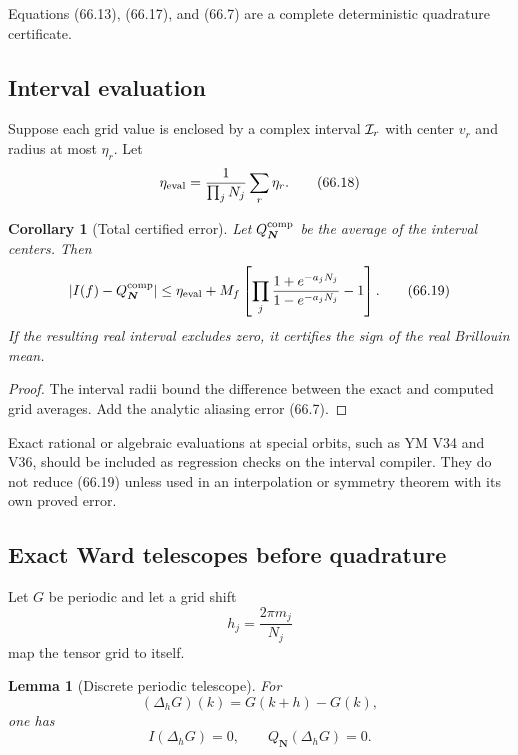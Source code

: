 \documentclass[11pt]{article}
\newtheorem{lemma}[theorem]{Lemma}
\newtheorem{corollary}[theorem]{Corollary}
\begin{document}
Equations (66.13), (66.17), and (66.7) are a complete deterministic
quadrature certificate.

\subsection{Interval evaluation}

Suppose each grid value is enclosed by a complex interval
\({\cal I}_r\) with center \(v_r\) and radius at most
\(\eta_r\).  Let
\[
                         \eta_{\rm eval}
             =\frac1{\prod_jN_j}\sum_r\eta_r.                 \tag{66.18}
\]

\begin{corollary}[Total certified error]
\label{cor:v11v66-interval}
Let \(Q_{\boldsymbol N}^{\rm comp}\) be the average of the interval
centers.  Then
\[
 |I(f)-Q_{\boldsymbol N}^{\rm comp}|
 \le\eta_{\rm eval}
 +M_f\left[\prod_j\frac{1+e^{-a_jN_j}}
                            {1-e^{-a_jN_j}}-1\right].          \tag{66.19}
\]
If the resulting real interval excludes zero, it certifies the sign of
the real Brillouin mean.
\end{corollary}

\begin{proof}
The interval radii bound the difference between the exact and computed
grid averages.  Add the analytic aliasing error (66.7).
\end{proof}

Exact rational or algebraic evaluations at special orbits, such as YM
V34 and V36, should be included as regression checks on the interval
compiler.  They do not reduce (66.19) unless used in an interpolation
or symmetry theorem with its own proved error.

\subsection{Exact Ward telescopes before quadrature}

Let \(G\) be periodic and let a grid shift
\[
                              h_j=\frac{2\pi m_j}{N_j}         \tag{66.20}
\]
map the tensor grid to itself.

\begin{lemma}[Discrete periodic telescope]
\label{lem:v11v66-telescope}
For
\[
                              (\Delta_hG)(k)=G(k+h)-G(k),
\]
one has
\[
                              I(\Delta_hG)=0,\qquad
                              Q_{\boldsymbol N}(\Delta_hG)=0. \tag{66.21}
\]
\end{lemma}
\end{document}
